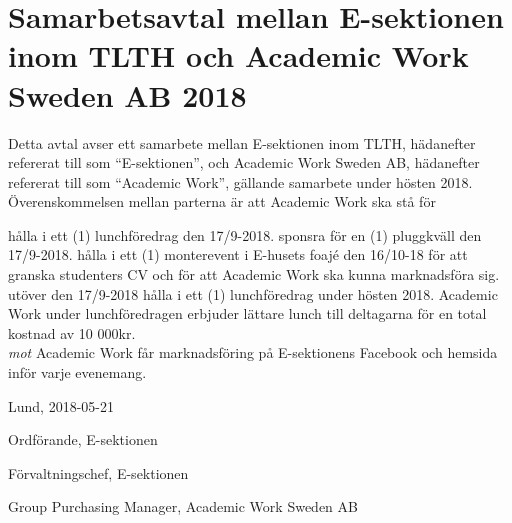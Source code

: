 \documentclass[10pt]{article}
\def\year{2018}
\def\doctitle{Samarbetsavtal mellan E-sektionen inom TLTH och Academic Work Sweden AB {\year}}
\def\date{2018-05-21} %
\begin{document}
        \section*{\doctitle}
        Detta avtal avser ett samarbete mellan E-sektionen inom TLTH, hädanefter refererat till som “E-sektionen”, och Academic Work Sweden AB, hädanefter refererat till som “Academic Work”, gällande samarbete under hösten 2018.\\
        Överenskommelsen mellan parterna är att Academic Work ska stå för
        \begin{attsatser}
            \att hålla i ett (1) lunchföredrag den 17/9-2018. 
            \att sponsra för en (1) pluggkväll den 17/9-2018.
            \att hålla i ett (1) monterevent i E-husets foajé den 16/10-18 för att granska studenters CV och för att Academic Work ska kunna marknadsföra sig.
            \att utöver den 17/9-2018 hålla i ett (1) lunchföredrag under hösten 2018.
            \att Academic Work under lunchföredragen erbjuder lättare lunch till deltagarna för en total kostnad av 10 000kr. \\
            \textit{mot}
            \att Academic Work får marknadsföring på E-sektionens Facebook och hemsida inför varje evenemang.
        \end{attsatser}
        
        \begin{signatures}{3}
            Lund, \date
            \signature{Daniel Bakic}{Ordförande, E-sektionen}
            \signature{Magnus Lundh}{Förvaltningschef, E-sektionen}
            \signature{Niklas Dennerholt}{Group Purchasing Manager, Academic Work Sweden AB}
        \end{signatures}
    
\end{document}
